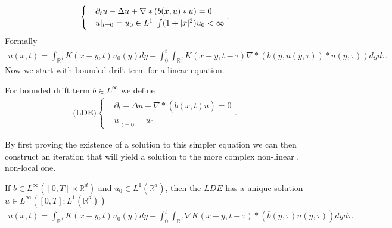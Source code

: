 \begin{align*}
  \begin{cases}
    &\partial_t u  - \Delta u + \nabla * (b(x,u)*u) = 0\\
    &u \rvert_{t=0} =u_{0} \in  L^{1} \ \int (1+\lvert x\rvert^2)u_{0} <\infty
  \end{cases}
.\end{align*}
Formally
\begin{align*}
  u(x,t)  = \int_{\mathbb{R}^{d} } K(x-y,t)u_{0}(y) dy - \int_0^{t} \int_{\mathbb{R}^{d} }K(x-y,t-\tau ) \nabla * (b(y,u(y,\tau ))*u(y,\tau ))dy d\tau 
.\end{align*}
Now we start with bounded drift term for a linear equation.
\begin{definition}[LDE]\label{LDE}
  For bounded drift term $\overline{b} \in  L^{\infty}  $ we define
\begin{align*}
  \text{(LDE)}\begin{cases}
    &\partial_t - \Delta u + \nabla * (\overline{b}(x,t)u ) = 0 \\ 
    & u \rvert_{t=0} = u_{0}
  \end{cases}
.\end{align*}
\end{definition}
\begin{remark}
  By first proving the existence of a solution to this simpler equation we can then construct an iteration that will yield
a solution to the more complex non-linear , non-local one.
\end{remark}
\begin{theorem}
  If $b \in  L^{\infty}([0,T] \times  \mathbb{R}^{d} ) $  and $u_{0} \in  L^1(\mathbb{R}^{d} )$, then the $LDE$ has a 
  unique solution $u \in L^{\infty}([0,T];L^{1}(\mathbb{R}^{d} ) ) $
  \begin{align*}
    u(x,t) = \int_{\mathbb{R}^{d} }K(x-y,t)u_{0}(y) dy  + \int_{0}^{t} \int_{\mathbb{R}^{d} } \nabla K(x-y,t-\tau ) * (\overline{b}(y,\tau )u(y,\tau ) ) dy d\tau 
  .\end{align*}
\end{theorem}
